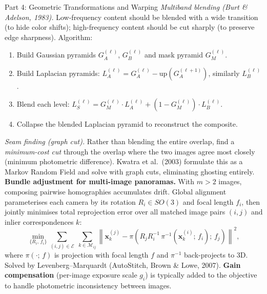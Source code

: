 \documentclass[letterpaper]{article}
\begin{document}
\begin{notes}{Part 4: Geometric Transformations and Warping}
\textit{Multiband blending (Burt \& Adelson, 1983).} Low-frequency content should be blended with a wide transition (to hide color shifts); high-frequency content should be cut sharply (to preserve edge sharpness). Algorithm:
\begin{enumerate}
    \item Build Gaussian pyramids $G_A^{(\ell)}$, $G_B^{(\ell)}$ and mask pyramid $G_M^{(\ell)}$.
    \item Build Laplacian pyramids: $L_A^{(\ell)} = G_A^{(\ell)} - \mathrm{up}(G_A^{(\ell+1)})$, similarly $L_B^{(\ell)}$.
    \item Blend each level: $L_S^{(\ell)} = G_M^{(\ell)}\cdot L_A^{(\ell)} + (1-G_M^{(\ell)})\cdot L_B^{(\ell)}$.
    \item Collapse the blended Laplacian pyramid to reconstruct the composite.
\end{enumerate}

\textit{Seam finding (graph cut).} Rather than blending the entire overlap, find a \emph{minimum-cost cut} through the overlap where the two images agree most closely (minimum photometric difference). Kwatra et al.\ (2003) formulate this as a Markov Random Field and solve with graph cuts, eliminating ghosting entirely.\\

\textbf{Bundle adjustment for multi-image panoramas.} With $m>2$ images, composing pairwise homographies accumulates drift. Global alignment parameterises each camera by its rotation $R_i\in SO(3)$ and focal length $f_i$, then jointly minimises total reprojection error over all matched image pairs $(i,j)$ and inlier correspondences $k$:
$$\min_{\{R_i,\,f_i\}} \sum_{(i,j)\in\mathcal{E}}\;\sum_{k\in\mathcal{M}_{ij}} \left\|\mathbf{x}_k^{(j)} - \pi\!\left(R_j R_i^{-1}\,\pi^{-1}\!\left(\mathbf{x}_k^{(i)};\,f_i\right);\,f_j\right)\right\|^2,$$
where $\pi(\cdot;\,f)$ is projection with focal length $f$ and $\pi^{-1}$ back-projects to 3D. Solved by Levenberg--Marquardt (AutoStitch, Brown \& Lowe, 2007). \textbf{Gain compensation} (per-image exposure scale $g_i$) is typically added to the objective to handle photometric inconsistency between images.




\end{notes}
\end{document}
